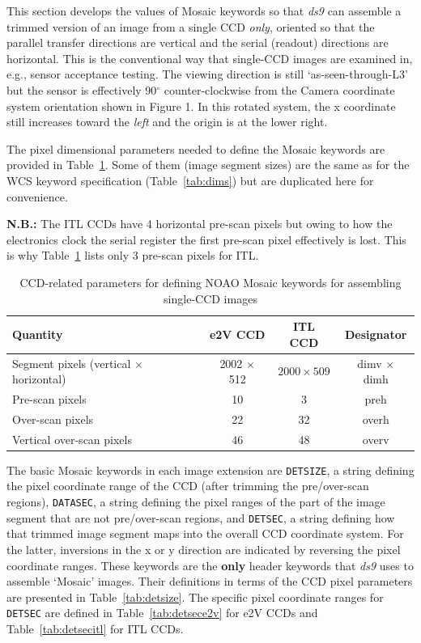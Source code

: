 \documentclass{article}[12pt]
\begin{document}
{This section develops the values of Mosaic keywords so that {\it ds9} can assemble a trimmed version of an image from a single CCD {\it only}, oriented so that the parallel transfer directions are vertical and the serial (readout) directions are horizontal.  This is the conventional way that single-CCD images are examined in, e.g., sensor acceptance testing.  The viewing direction is still `as-seen-through-L3' but the sensor is effectively 90$^\circ$ counter-clockwise from the Camera coordinate system orientation shown in Figure 1.  In this rotated system, the x coordinate still increases toward the {\it left} and the origin is at the lower right.

The pixel dimensional parameters needed to define the Mosaic keywords are provided in Table~\ref{tab:mosaic}.  Some of them (image segment sizes) are the same as for the WCS keyword specification (Table~\ref{tab:dims}) but are duplicated here for convenience.

{\bf N.B.:} The ITL CCDs have 4 horizontal pre-scan pixels but owing to how the electronics clock the serial register the first pre-scan pixel effectively is lost.  This is why Table~\ref{tab:mosaic} lists only 3 pre-scan pixels for ITL.

\begin{table}
\begin{centering}
\begin{tabular}{| l | c | c | c |}
\hline
{\bf Quantity} & {\bf e2V CCD} & {\bf ITL CCD} & {\bf Designator} \\
\hline
Segment pixels (vertical $\times$ horizontal) & 2002 $\times$ 512 & $2000 \times 509$ & dimv $\times$ dimh \\
Pre-scan pixels & 10 & 3 & preh \\
Over-scan pixels & 22 & 32 & overh \\
Vertical over-scan pixels & 46 & 48 & overv \\
\hline
\end{tabular}
\caption{CCD-related parameters for defining NOAO Mosaic keywords for assembling single-CCD images\label{tab:mosaic}}
\end{centering}
\end{table}

The basic Mosaic keywords in each image extension are {\tt DETSIZE}, a string defining the pixel coordinate range of the CCD (after trimming the pre/over-scan regions), {\tt DATASEC}, a string defining the pixel ranges of the part of the image segment that are not pre/over-scan regions, and {\tt DETSEC}, a string defining how that trimmed image segment maps into the overall CCD coordinate system.  For the latter, inversions in the x or y direction are indicated by reversing the pixel coordinate ranges.  These keywords are the {\bf only} header keywords that {\it ds9} uses to assemble `Mosaic' images.  Their definitions in terms of the CCD pixel parameters are presented in Table~\ref{tab:detsize}.  The specific pixel coordinate ranges for {\tt DETSEC} are defined in Table~\ref{tab:detsece2v} for e2V CCDs and Table~\ref{tab:detsecitl} for ITL CCDs.

}
\end{document}
